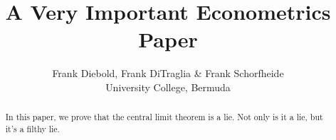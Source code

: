 \documentclass[12pt,letterpaper]{article}
\title{A Very Important Econometrics Paper}
\author{Frank Diebold, Frank DiTraglia & Frank Schorfheide \\ University College, Bermuda}
\begin{document}
\maketitle

\begin{abstract}
	In this paper, we prove that the central limit theorem is a lie. 
	Not only is it a lie, but it's a filthy lie.
\end{abstract}
\end{document}
